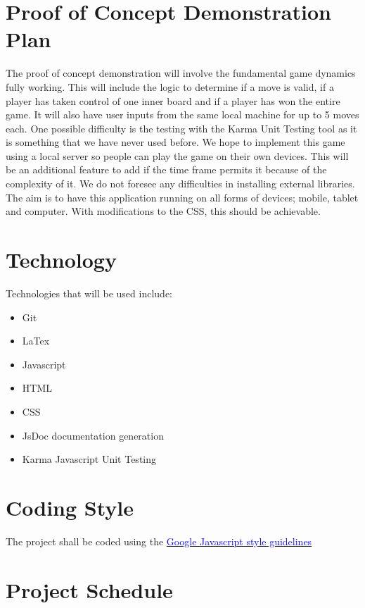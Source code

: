 \documentclass{article}
\begin{document}
\section{Proof of Concept Demonstration Plan} The proof of concept demonstration
will involve the fundamental game dynamics  fully working. This will include the
logic to determine if a move is valid, if a  player has taken control of one
inner board and if a player has won the entire  game. It will also have user
inputs from the same local machine for up to 5  moves each. One possible
difficulty is the testing with the Karma Unit Testing  tool as it is something
that we have never used before. We hope to implement  this game using a local
server so people can play the game on their own devices.  This will be an
additional feature to add if the time frame permits it because  of the
complexity of it. We do not foresee any difficulties in installing  external
libraries. The aim is to have this application running on all forms of  devices;
mobile, tablet and computer. With modifications to the CSS, this should  be
achievable.

\section{Technology}
Technologies that will be used include:

\begin{itemize}

  \item Git
  \item LaTex
  \item Javascript
  \item HTML
  \item CSS
  \item JsDoc documentation generation
  \item Karma Javascript Unit Testing 

\end{itemize}

\section{Coding Style}
The project shall be coded using the
\href{https://google.github.io/styleguide/javascriptguide.xml}{\textcolor{blue}{Google Javascript
style guidelines}}

\section{Project Schedule}
\end{document}
